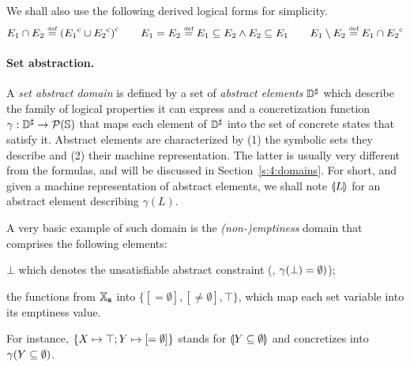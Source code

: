 We shall also use the following derived logical forms for simplicity.
\[
E_1 \cap E_2 \stackrel{\textrm{\tiny def}}{=} {({E_1}^{\mathrm{c}} \cup {E_2}^{\mathrm{c}})}^{\mathrm{c}}
\qquad
E_1 = E_2 \stackrel{\textrm{\tiny def}}{=} E_1 \subseteq E_2 \wedge E_2 \subseteq E_1
\qquad
E_1 \setminus E_2 \stackrel{\textrm{\tiny def}}{=} E_1 \cap {E_2}^{\mathrm{c}}
\]

\paragraph{Set abstraction.}
A {\em set abstract domain} is defined by a set of {\em abstract elements}
\( {\mathbb{D}}^{\sharp} \) which describe the family of logical properties it can
express and a concretization function \( \gamma: {\mathbb{D}}^{\sharp} \rightarrow
\mathcal{P}(\mathbb{S}) \) that maps each element of \( {\mathbb{D}}^{\sharp} \) into the set
of concrete states that satisfy it.
Abstract elements are characterized by
(1) the symbolic sets they describe and
(2) their machine representation.
The latter is usually very different from the formulas, and will be
discussed in Section~\ref{s:4:domains}.
For short, and given a machine representation of abstract elements,
we shall note \( \llparenthesis L \rrparenthesis \) for an abstract element describing
\( \gamma( L ) \).
\begin{example}
  \label{ex:1:mt}
  A very basic example of such domain is the {\em (non-)emptiness} domain
  that comprises the following elements:
  \begin{compactitem}
  \item \( \bot \) which denotes the unsatisfiable abstract constraint
    (\ie, \( \gamma( \bot ) = \emptyset ) \));
  \item the functions from \( \mathbb{X}_{\bf s} \) into \( \{ [=\emptyset],
    [\not=\emptyset], \top \} \), which map each set variable into
    its emptiness value.
  \end{compactitem}
  For instance, \( \{ X \mapsto \top; Y \mapsto [=\emptyset] \} \)
  stands for \( \llparenthesis Y \subseteq \emptyset \rrparenthesis \) and concretizes into
  \( \gamma( Y \subseteq \emptyset ) \).
\end{example}

